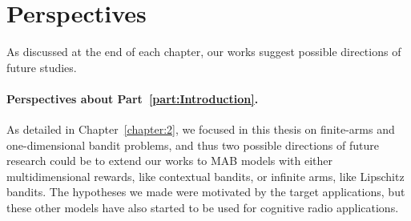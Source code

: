 \section{Perspectives}

As discussed at the end of each chapter,
our works suggest possible directions of future studies.





\paragraph{Perspectives about \textbf{Part~\ref{part:Introduction}}.}



As detailed in Chapter~\ref{chapter:2}, we focused in this thesis on finite-arms and one-dimensional bandit problems,
and thus two possible directions of future research could be to extend our works
to MAB models with either multidimensional rewards, like contextual bandits, or infinite arms, like Lipschitz bandits.
The hypotheses we made were motivated by the target applications, but these other models have also started to be used for cognitive radio applications.



